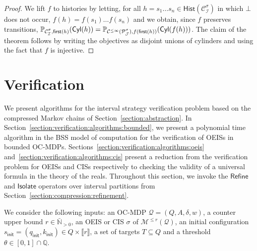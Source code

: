 \documentclass[a4paper,UKenglish,cleveref,autoref,thm-restate,colorlinks]{lipics-v2021}
\newcommand{\init}{\mathsf{init}}
\newcommand{\integerInterval}[1]{\llbracket{}#1\rrbracket{}}
\newcommand{\ccInt}[2]{\left[#1, #2\right]}
\newcommand{\IN}{\mathbb{N}}
\newcommand{\IQ}{\mathbb{Q}}
\newcommand{\INposBar}{\bar{\IN}_{>0}}
\newcommand{\cyl}[1]{\mathsf{Cyl}(#1)}
\newcommand{\mdp}{\mathcal{M}}
\newcommand{\histSet}[1]{\mathsf{Hist}(#1)}
\newcommand{\hist}{h}
\newcommand{\first}[1]{\mathsf{first}(#1)}
\newcommand{\indexLast}{n}
\newcommand{\weight}{w}
\newcommand{\ocmdp}{\mathcal{Q}}
\newcommand{\ocmdpFin}[2]{\mdp^{\leq #2}(#1)}
\newcommand{\ocStateSpace}{Q}
\newcommand{\ocState}{q}
\newcommand{\ocCount}{k}
\newcommand{\ocConfig}{s}
\newcommand{\ocActionSpace}{A}
\newcommand{\ocTrans}{\delta}
\newcommand{\ocTuple}{(\ocStateSpace, \ocActionSpace, \ocTrans, \weight)}
\newcommand{\counterUB}{r}
\newcommand{\mchain}{\mathcal{C}}
\newcommand{\ocChain}{\mathcal{P}}
\newcommand{\ocChainFin}[2]{\mchain^{\leq #2}(#1)}
\newcommand{\intPart}{\mathcal{I}}
\newcommand{\intPartB}{\mathcal{J}}
\newcommand{\compressChainStrat}[1]{\mchain^{#1}_{\intPart}}
\newcommand{\compressChain}{\compressChainStrat{\strat}}
\newcommand{\cisChainStrat}[1]{\ocChain^{#1}_{\intPartB}}
\newcommand{\cisChain}{\cisChainStrat{\strat}}
\newcommand{\target}{T}
\newcommand{\thresProba}{\theta}
\newcommand{\stratGeneric}[1]{{\sigma_{#1}}}
\newcommand{\strat}{\stratGeneric{}}
\begin{document}
\begin{proof}
  We lift $f$ to histories by letting, for all $\hist=\ocConfig_1\ldots\ocConfig_\indexLast\in\histSet{\compressChain}$ in which $\bot$ does not occur, $f(\hist) = f(\ocConfig_1)\ldots f(\ocConfig_\indexLast)$ and we obtain, since $f$ preserves transitions, $\probaMCverb{\compressChain}{\first{\hist}}(\cyl{\hist})=\probaMCverb{\ocChainFin{\cisChain}{\infty}}{f(\first{\hist})}(\cyl{f(\hist)})$.
  The claim of the theorem follows by writing the objectives as disjoint unions of cylinders and using the fact that $f$ is injective.
\end{proof}



 
\section{Verification}\label{section:verification}

We present algorithms for the interval strategy verification problem based on the compressed Markov chains of Section~\ref{section:abstraction}.
In Section~\ref{section:verification:algorithms:bounded}, we present a polynomial time algorithm in the BSS model of computation for the verification of OEISs in bounded OC-MDPs.
Sections~\ref{section:verification:algorithms:oeis} and~\ref{section:verification:algorithms:cis} present a reduction from the verification problem for OEISs and CISs respectively to checking the validity of a universal formula in the theory of the reals.
Throughout this section, we invoke the $\mathsf{Refine}$ and $\mathsf{Isolate}$ operators over interval partitions from Section~\ref{section:compression:refinement}.

We consider the following inputs: an OC-MDP $\ocmdp=\ocTuple$, a counter upper bound $\counterUB\in\INposBar$, an OEIS or CIS $\strat$ of $\ocmdpFin{\ocmdp}{\counterUB}$, an initial configuration $\ocConfig_\init=(\ocState_\init, \ocCount_\init)\in\ocStateSpace\times\integerInterval{\counterUB}$, a set of targets $\target\subseteq\ocStateSpace$ and a threshold $\thresProba\in\ccInt{0}{1}\cap\IQ$.
\end{document}
